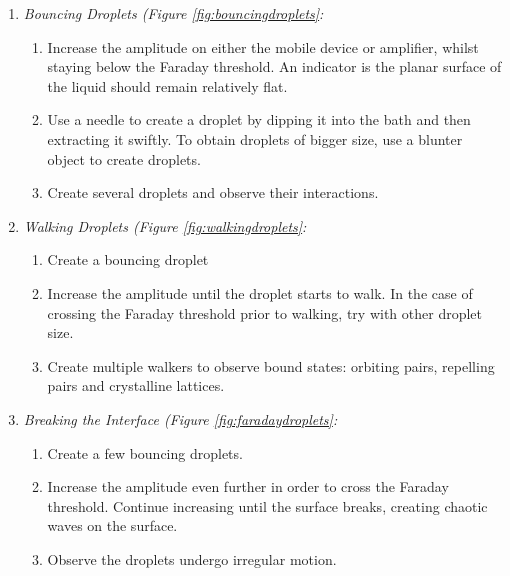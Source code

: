 \begin{enumerate}

\item \textbf{ }\textit{Bouncing Droplets (Figure \ref{fig:bouncingdroplets}:}
\begin{enumerate}
\item  Increase the amplitude on either the mobile device or amplifier, whilst staying below the Faraday threshold. An indicator is the planar surface of the liquid should remain relatively flat.

\item  Use a needle to create a droplet by dipping it into the bath and then extracting it swiftly. To obtain droplets of bigger size, use a blunter object to create droplets.

\item  Create several droplets and observe their interactions.

\end{enumerate}

\noindent 

\item  \textit{Walking Droplets (Figure \ref{fig:walkingdroplets}:}
\begin{enumerate}
\item  Create a bouncing droplet 

\item  Increase the amplitude until the droplet starts to walk. In the case of crossing the Faraday threshold prior to walking, try with other droplet size.

\item  Create multiple walkers to observe bound states: orbiting pairs, repelling pairs and crystalline lattices.

\end{enumerate}


\item  \textit{Breaking the Interface (Figure \ref{fig:faradaydroplets}:}

\begin{enumerate} 

\item  Create a few bouncing droplets.

\item  Increase the amplitude even further in order to cross the Faraday threshold. Continue increasing until the surface breaks, creating chaotic waves on the surface.

\item  Observe the droplets undergo irregular motion.


\end{enumerate}
\end{enumerate}
